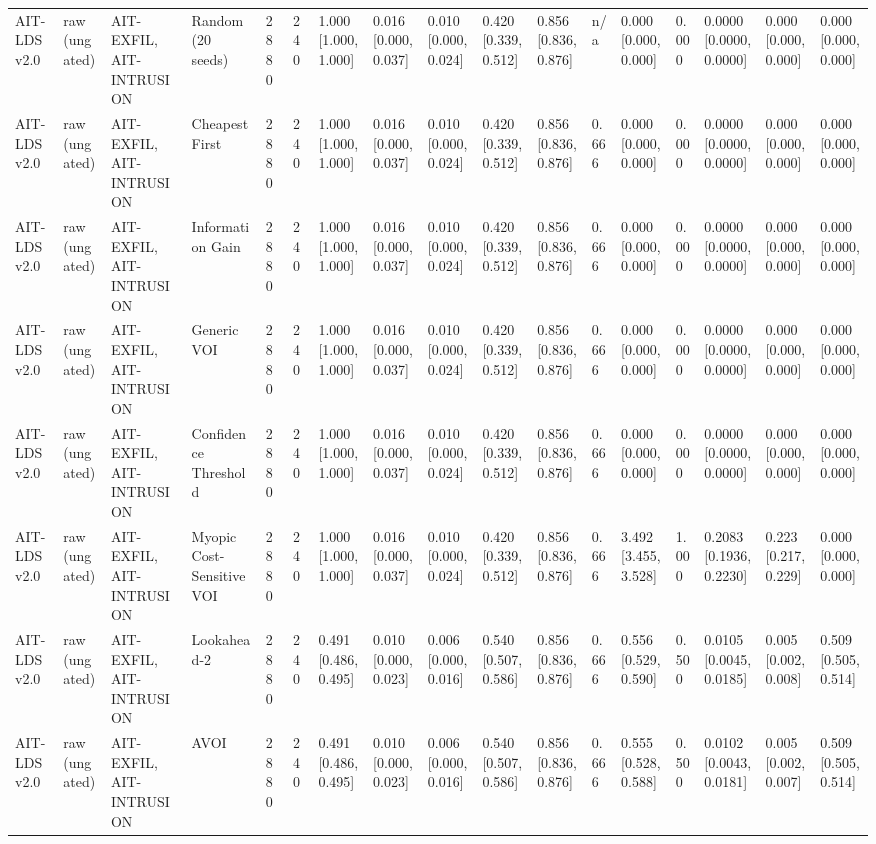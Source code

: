 \begin{table}[!ht]
{\begin{tabular}{lllllllllllllllll}
AIT-LDS v2.0 & raw (ungated) & AIT-EXFIL, AIT-INTRUSION & Random (20 seeds) & 2880 & 240 & 1.000 [1.000, 1.000] & 0.016 [0.000, 0.037] & 0.010 [0.000, 0.024] & 0.420 [0.339, 0.512] & 0.856 [0.836, 0.876] & n/a & 0.000 [0.000, 0.000] & 0.000 & 0.0000 [0.0000, 0.0000] & 0.000 [0.000, 0.000] & 0.000 [0.000, 0.000] \\
AIT-LDS v2.0 & raw (ungated) & AIT-EXFIL, AIT-INTRUSION & Cheapest First & 2880 & 240 & 1.000 [1.000, 1.000] & 0.016 [0.000, 0.037] & 0.010 [0.000, 0.024] & 0.420 [0.339, 0.512] & 0.856 [0.836, 0.876] & 0.666 & 0.000 [0.000, 0.000] & 0.000 & 0.0000 [0.0000, 0.0000] & 0.000 [0.000, 0.000] & 0.000 [0.000, 0.000] \\
AIT-LDS v2.0 & raw (ungated) & AIT-EXFIL, AIT-INTRUSION & Information Gain & 2880 & 240 & 1.000 [1.000, 1.000] & 0.016 [0.000, 0.037] & 0.010 [0.000, 0.024] & 0.420 [0.339, 0.512] & 0.856 [0.836, 0.876] & 0.666 & 0.000 [0.000, 0.000] & 0.000 & 0.0000 [0.0000, 0.0000] & 0.000 [0.000, 0.000] & 0.000 [0.000, 0.000] \\
AIT-LDS v2.0 & raw (ungated) & AIT-EXFIL, AIT-INTRUSION & Generic VOI & 2880 & 240 & 1.000 [1.000, 1.000] & 0.016 [0.000, 0.037] & 0.010 [0.000, 0.024] & 0.420 [0.339, 0.512] & 0.856 [0.836, 0.876] & 0.666 & 0.000 [0.000, 0.000] & 0.000 & 0.0000 [0.0000, 0.0000] & 0.000 [0.000, 0.000] & 0.000 [0.000, 0.000] \\
AIT-LDS v2.0 & raw (ungated) & AIT-EXFIL, AIT-INTRUSION & Confidence Threshold & 2880 & 240 & 1.000 [1.000, 1.000] & 0.016 [0.000, 0.037] & 0.010 [0.000, 0.024] & 0.420 [0.339, 0.512] & 0.856 [0.836, 0.876] & 0.666 & 0.000 [0.000, 0.000] & 0.000 & 0.0000 [0.0000, 0.0000] & 0.000 [0.000, 0.000] & 0.000 [0.000, 0.000] \\
AIT-LDS v2.0 & raw (ungated) & AIT-EXFIL, AIT-INTRUSION & Myopic Cost-Sensitive VOI & 2880 & 240 & 1.000 [1.000, 1.000] & 0.016 [0.000, 0.037] & 0.010 [0.000, 0.024] & 0.420 [0.339, 0.512] & 0.856 [0.836, 0.876] & 0.666 & 3.492 [3.455, 3.528] & 1.000 & 0.2083 [0.1936, 0.2230] & 0.223 [0.217, 0.229] & 0.000 [0.000, 0.000] \\
AIT-LDS v2.0 & raw (ungated) & AIT-EXFIL, AIT-INTRUSION & Lookahead-2 & 2880 & 240 & 0.491 [0.486, 0.495] & 0.010 [0.000, 0.023] & 0.006 [0.000, 0.016] & 0.540 [0.507, 0.586] & 0.856 [0.836, 0.876] & 0.666 & 0.556 [0.529, 0.590] & 0.500 & 0.0105 [0.0045, 0.0185] & 0.005 [0.002, 0.008] & 0.509 [0.505, 0.514] \\
AIT-LDS v2.0 & raw (ungated) & AIT-EXFIL, AIT-INTRUSION & AVOI & 2880 & 240 & 0.491 [0.486, 0.495] & 0.010 [0.000, 0.023] & 0.006 [0.000, 0.016] & 0.540 [0.507, 0.586] & 0.856 [0.836, 0.876] & 0.666 & 0.555 [0.528, 0.588] & 0.500 & 0.0102 [0.0043, 0.0181] & 0.005 [0.002, 0.007] & 0.509 [0.505, 0.514] \\

\end{tabular}}
\end{table}
